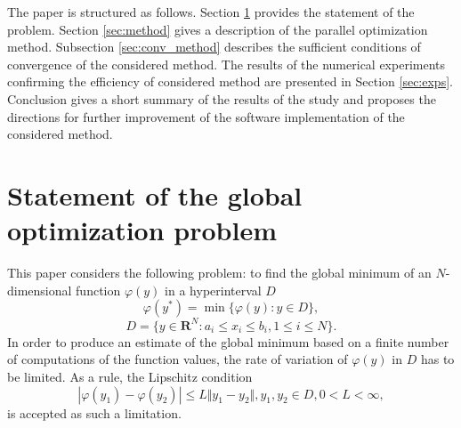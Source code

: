 \documentclass[runningheads]{llncs}
\begin{document}
The paper is structured as follows. Section \ref{sec:problem} provides the statement of the problem.
Section \ref{sec:method} gives a description of the parallel optimization method.
Subsection \ref{sec:conv_method} describes the sufficient conditions of convergence
of the considered method.
The results of the numerical experiments confirming the efficiency of considered method are
presented in Section \ref{sec:exps}.
Conclusion gives a short summary of the results of the study and proposes the
directions for further improvement of the software implementation of the considered method.


\section{Statement of the global optimization problem}
\label{sec:problem}
This paper considers the following problem:
to find the global minimum of an  \(N\)-dimensional function \(\varphi(y)\) in
a hyperinterval $D$
\begin{equation}
\label{eq:task}
\varphi(y^*)=\min\{\varphi(y):y\in D\},
\end{equation}
\begin{displaymath}
D=\{y\in \mathbf{R}^N:a_i\leqslant x_i\leqslant{b_i}, 1\leqslant{i}\leqslant{N}\}.
\end{displaymath}
In order to produce an estimate of the global minimum based on a finite number of
computations of the function values, the rate of variation of \(\varphi(y)\) in \(D\) has to
be limited.
As a rule, the Lipschitz condition
\begin{displaymath}
\label{lip}
|\varphi(y_1)-\varphi(y_2)|\leqslant L\Vert y_1-y_2\Vert,y_1,y_2\in D,0<L<\infty,
\end{displaymath}
is accepted as such a limitation.
\end{document}
